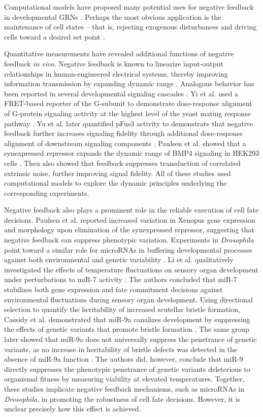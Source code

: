 Computational models have proposed many potential uses for negative feedback in developmental GRNs \cite{Freeman2000}. Perhaps the most obvious application is the maintenance of cell states – that is, rejecting exogenous disturbances and driving cells toward a desired set point \cite{Alon2007,Behar2007,Yi2000}. 

Quantitative measurements have revealed additional functions of negative feedback \textit{in vivo}. Negative feedback is known to linearize input-output relationships in human-engineered electrical systems, thereby improving information transmission by expanding dynamic range \cite{Black}. Analogous behavior has been reported in several developmental signaling cascades \cite{Bhalla2002,Cheong2011,Paulsen2011,Yi2003,Yu2008}. Yi et al. used a FRET-based reporter of the G\textalpha-subunit to demonstrate dose-response alignment of G-protein signaling activity at the highest level of the yeast mating response pathway \cite{Yi2003}. Yu et al. later quantified pFus3 activity to demonstrate that negative feedback further increases signaling fidelity through additional dose-response alignment of downstream signaling components \cite{Yu2008}. Paulsen et al. showed that a synexpressed repressor expands the dynamic range of BMP4 signaling in HEK293 cells \cite{Paulsen2011}. Theu also showed that feedback suppresses transduction of correlated extrinsic noise, further improving signal fidelity. All of these studies used computational models to explore the dynamic principles underlying the corresponding experiments. 

Negative feedback also plays a prominent role in the reliable execution of cell fate decisions. Paulsen et al. reported increased variation in Xenopus gene expression and morphology upon elimination of the synexpressed repressor, suggesting that negative feedback can suppress phenotypic variation. Experiments in \textit{Drosophila} point toward a similar role for microRNAs in buffering developmental processes against both environmental and genetic variability \cite{Cassidy2016,Cassidy2013,Li2009}. Li et al. qualitatively investigated the effects of temperature fluctuations on sensory organ development under perturbations to miR-7 activity \cite{Li2009}. The authors concluded that miR-7 stabilizes both gene expression and fate commitment decisions against environmental fluctuations during sensory organ development. Using directional selection to quantify the heritability of increased scutellar bristle formation, Cassidy et al. demonstrated that miR-9a canalizes development by suppressing the effects of genetic variants that promote bristle formation \cite{Cassidy2013}. The same group later showed that miR-9a does not universally suppress the penetrance of genetic variants, as no increase in heritability of bristle defects was detected in the absence of miR-9a function \cite{Cassidy2016}. The authors did, however, conclude that miR-9 directly suppresses the phenotypic penetrance of genetic variants deleterious to organismal fitness by measuring viability at elevated temperatures. Together, these studies implicate negative feedback mechanisms, such as microRNAs in \textit{Drosophila}, in promoting the robustness of cell fate decisions. However, it is unclear precisely how this effect is achieved.

